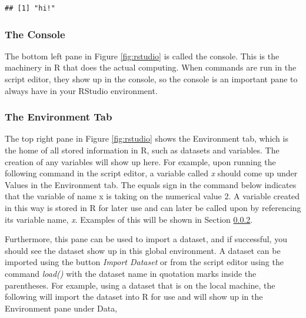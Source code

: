 \begin{knitrout}
\color{fgcolor}\begin{kframe}
\begin{alltt}
\hlstd{(}\hlstd{)}
\end{alltt}
\begin{verbatim}
## [1] "hi!"
\end{verbatim}
\end{kframe}
\end{knitrout}


\subsubsection{The Console} 
The bottom left pane in Figure \ref{fig:rstudio} is called the console.  This is the machinery in \textsf{R} that does the actual computing.  When commands are run in the script editor, they show up in the console, so the console is an important pane to always have in your \textsf{RStudio environment}.  

\subsubsection{The Environment Tab} 
The top right pane in Figure \ref{fig:rstudio} shows the \textsf{Environment} tab, which is the home of all stored information in \textsf{R}, such as datasets and variables.  The creation of any variables will show up here.  For example, upon running the following command in the script editor, a variable called \textit{x} should come up under \textsf{Values} in the \textsf{Environment} tab. The equals sign in the command below indicates that the variable of name \textsf{x} is taking on the numerical value 2. A variable created in this way is stored in \textsf{R} for later use and can later be called upon by referencing its variable name, \textit{x}.  Examples of this will be shown in Section \ref{}.  

\begin{knitrout}
\color{fgcolor}\begin{kframe}
\begin{alltt}
 \hlkwb{=} 
\end{alltt}
\end{kframe}
\end{knitrout}


Furthermore, this pane can be used to import a dataset, and if successful, you should see the dataset show up in this global environment.  A dataset can be imported using the button \textit{Import Dataset} or from the script editor using the command \textit{load()} with the dataset name in quotation marks inside the parentheses.  For example, using a dataset that is on the local machine, the following will import the dataset into \textsf{R} for use and will show up in the \textsf{Environment} pane under \textsf{Data}, 

